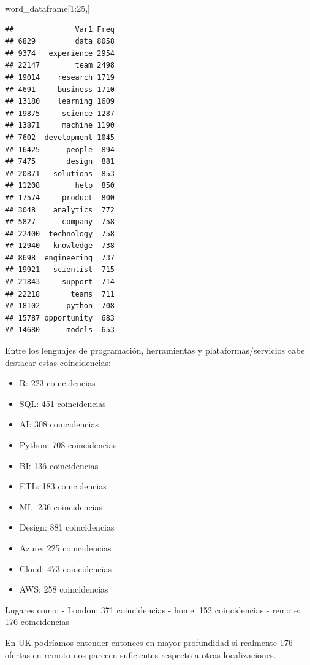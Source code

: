 \documentclass[
]{article}
\newenvironment{Shaded}{\begin{snugshade}}{\end{snugshade}}
\newcommand{\DecValTok}[1]{\textcolor[rgb]{0.86,0.86,0.80}{#1}}
\newcommand{\NormalTok}[1]{\textcolor[rgb]{0.80,0.80,0.80}{#1}}
\newcommand{\OperatorTok}[1]{\textcolor[rgb]{0.94,0.94,0.82}{#1}}
\providecommand{\tightlist}{%
  \setlength{\itemsep}{0pt}\setlength{\parskip}{0pt}}
\begin{document}
\begin{Shaded}
\begin{Highlighting}[]
\NormalTok{word\_dataframe[}\DecValTok{1}\OperatorTok{:}\DecValTok{25}\NormalTok{,]}
\end{Highlighting}
\end{Shaded}

\begin{verbatim}
##              Var1 Freq
## 6829         data 8058
## 9374   experience 2954
## 22147        team 2498
## 19014    research 1719
## 4691     business 1710
## 13180    learning 1609
## 19875     science 1287
## 13871     machine 1190
## 7602  development 1045
## 16425      people  894
## 7475       design  881
## 20871   solutions  853
## 11208        help  850
## 17574     product  800
## 3048    analytics  772
## 5827      company  758
## 22400  technology  758
## 12940   knowledge  738
## 8698  engineering  737
## 19921   scientist  715
## 21843     support  714
## 22218       teams  711
## 18102      python  708
## 15787 opportunity  683
## 14680      models  653
\end{verbatim}

Entre los lenguajes de programación, herramientas y
plataformas/servicios cabe destacar estas coincidencias:

\begin{itemize}
\tightlist
\item
  R: 223 coincidencias
\item
  SQL: 451 coincidencias
\item
  AI: 308 coincidencias
\item
  Python: 708 coincidencias
\item
  BI: 136 coincidencias
\item
  ETL: 183 coincidencias
\item
  ML: 236 coincidencias
\item
  Design: 881 coincidencias
\item
  Azure: 225 coincidencias
\item
  Cloud: 473 coincidencias
\item
  AWS: 258 coincidencias
\end{itemize}

Lugares como: - London: 371 coincidencias - home: 152 coincidencias -
remote: 176 coincidencias

En UK podríamos entender entonces en mayor profundidad si realmente 176
ofertas en remoto nos parecen suficientes respecto a otras
localizaciones.
\end{document}
